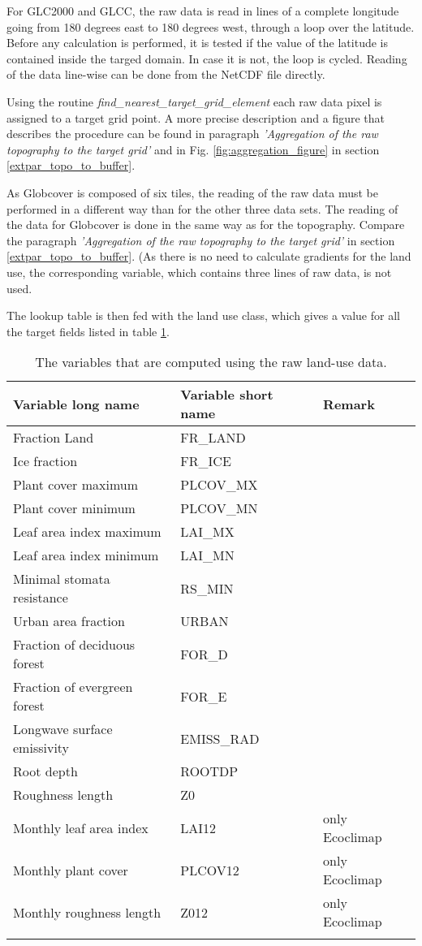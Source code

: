 \documentclass[a4paper,10pt,DIV14,BCOR1cm,titlepage,twoside]{scrartcl}
\providecommand{\tabularnewline}{\\}
\begin{document}
For GLC2000 and GLCC, the raw data is read in lines of a complete longitude going from 180 degrees east to 180 degrees west, through a loop over the latitude. Before any calculation is performed, it is tested if the value of the latitude is contained inside the targed domain. In case it is not, the loop is cycled. Reading of the data line-wise can be done from the NetCDF file directly. \par\medskip\noindent
 Using the routine \textit{find\_nearest\_target\_grid\_element} each raw data pixel is assigned to a target grid point. A more precise description and a figure that describes the procedure can be found in paragraph \textit{'Aggregation of the raw topography to the target grid'} and in Fig. \ref{fig:aggregation_figure} in section \ref{extpar_topo_to_buffer}.\par\medskip\noindent
As Globcover is composed of six tiles, the reading of the raw data must be performed in a different way than for the other three data sets. The reading of the data for Globcover is done in the same way as for the topography. Compare the paragraph \textit{'Aggregation of the raw topography to the target grid'} in section \ref{extpar_topo_to_buffer}. (As there is no need to calculate gradients for the land use, the corresponding variable, which contains three lines of raw data, is not used. \par\medskip\noindent
The lookup table is then fed with the land use class, which gives a value for all the target fields listed in table \ref{tab:target_fields_lu}.\par\medskip
\begin{longtable}{lll}
\textbf{Variable long name} & \textbf{Variable short name} &  \textbf{Remark} \tabularnewline
\hline
\endhead
\hline
Fraction Land & FR\_LAND  \tabularnewline
Ice fraction & FR\_ICE  \tabularnewline
Plant cover maximum & PLCOV\_MX  \tabularnewline
Plant cover minimum & PLCOV\_MN  \tabularnewline
Leaf area index maximum & LAI\_MX  \tabularnewline
Leaf area index minimum & LAI\_MN  \tabularnewline
Minimal stomata resistance & RS\_MIN  \tabularnewline
Urban area fraction & URBAN  \tabularnewline
Fraction of deciduous forest & FOR\_D  \tabularnewline
Fraction of evergreen forest & FOR\_E  \tabularnewline
Longwave surface emissivity & EMISS\_RAD  \tabularnewline
Root depth & ROOTDP  \tabularnewline
Roughness length & Z0  \tabularnewline
Monthly leaf area index & LAI12 & only Ecoclimap \tabularnewline
Monthly plant cover & PLCOV12 & only Ecoclimap \tabularnewline
Monthly roughness length & Z012 & only Ecoclimap \tabularnewline
\bottomrule
\caption{The variables that are computed using the raw land-use data.}
\label{tab:target_fields_lu}
\end{longtable}
\end{document}

